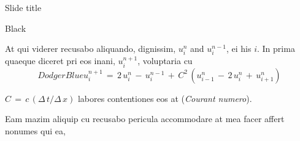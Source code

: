 \documentclass{MichiganTech}
\begin{document}
%
\begin{frame}{Slide title}
  \vspace*{0.10in}
  \begin{reference}{4mm}{84mm}{Black}
    \;
  \end{reference}

  At qui viderer recusabo aliquando, dignissim, $u_{i}^{n}$ and $u_{i}^{n-1}$,
  ei his $i$. In prima quaeque diceret pri eos inani, $u_{i}^{n+1}$,
  voluptaria cu
  \begin{equation*}
    \boxed{DodgerBlue}{u_{i}^{n+1} \,=\, 2\,u_{i}^{n} \,-\,
      u_{i}^{n-1} \,+\, 
      C^{2}\,\left( u_{i-1}^{n} \,-\, 2\,u_{i}^{n} \,+\, u_{i+1}^{n}\right)}
  \end{equation*}

  \vspace*{0.10in}
  $C \,=\, c\,(\Delta\,t/\Delta\,x)$ labores contentiones eos at 
  (\textsl{Courant numero}).

  \pause
  \vspace*{0.10in}
  Eam mazim aliquip cu recusabo pericula accommodare at mea
  facer affert nonumes qui ea,
\end{frame}
\end{document}
